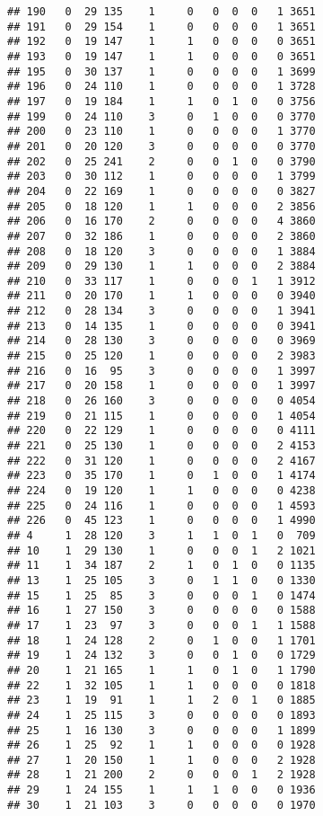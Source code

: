 \documentclass[
]{book}
\begin{document}
\begin{verbatim}
## 190   0  29 135    1     0   0  0  0   1 3651
## 191   0  29 154    1     0   0  0  0   1 3651
## 192   0  19 147    1     1   0  0  0   0 3651
## 193   0  19 147    1     1   0  0  0   0 3651
## 195   0  30 137    1     0   0  0  0   1 3699
## 196   0  24 110    1     0   0  0  0   1 3728
## 197   0  19 184    1     1   0  1  0   0 3756
## 199   0  24 110    3     0   1  0  0   0 3770
## 200   0  23 110    1     0   0  0  0   1 3770
## 201   0  20 120    3     0   0  0  0   0 3770
## 202   0  25 241    2     0   0  1  0   0 3790
## 203   0  30 112    1     0   0  0  0   1 3799
## 204   0  22 169    1     0   0  0  0   0 3827
## 205   0  18 120    1     1   0  0  0   2 3856
## 206   0  16 170    2     0   0  0  0   4 3860
## 207   0  32 186    1     0   0  0  0   2 3860
## 208   0  18 120    3     0   0  0  0   1 3884
## 209   0  29 130    1     1   0  0  0   2 3884
## 210   0  33 117    1     0   0  0  1   1 3912
## 211   0  20 170    1     1   0  0  0   0 3940
## 212   0  28 134    3     0   0  0  0   1 3941
## 213   0  14 135    1     0   0  0  0   0 3941
## 214   0  28 130    3     0   0  0  0   0 3969
## 215   0  25 120    1     0   0  0  0   2 3983
## 216   0  16  95    3     0   0  0  0   1 3997
## 217   0  20 158    1     0   0  0  0   1 3997
## 218   0  26 160    3     0   0  0  0   0 4054
## 219   0  21 115    1     0   0  0  0   1 4054
## 220   0  22 129    1     0   0  0  0   0 4111
## 221   0  25 130    1     0   0  0  0   2 4153
## 222   0  31 120    1     0   0  0  0   2 4167
## 223   0  35 170    1     0   1  0  0   1 4174
## 224   0  19 120    1     1   0  0  0   0 4238
## 225   0  24 116    1     0   0  0  0   1 4593
## 226   0  45 123    1     0   0  0  0   1 4990
## 4     1  28 120    3     1   1  0  1   0  709
## 10    1  29 130    1     0   0  0  1   2 1021
## 11    1  34 187    2     1   0  1  0   0 1135
## 13    1  25 105    3     0   1  1  0   0 1330
## 15    1  25  85    3     0   0  0  1   0 1474
## 16    1  27 150    3     0   0  0  0   0 1588
## 17    1  23  97    3     0   0  0  1   1 1588
## 18    1  24 128    2     0   1  0  0   1 1701
## 19    1  24 132    3     0   0  1  0   0 1729
## 20    1  21 165    1     1   0  1  0   1 1790
## 22    1  32 105    1     1   0  0  0   0 1818
## 23    1  19  91    1     1   2  0  1   0 1885
## 24    1  25 115    3     0   0  0  0   0 1893
## 25    1  16 130    3     0   0  0  0   1 1899
## 26    1  25  92    1     1   0  0  0   0 1928
## 27    1  20 150    1     1   0  0  0   2 1928
## 28    1  21 200    2     0   0  0  1   2 1928
## 29    1  24 155    1     1   1  0  0   0 1936
## 30    1  21 103    3     0   0  0  0   0 1970

\end{verbatim}
\end{document}
